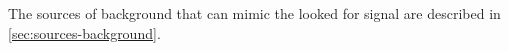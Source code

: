 The sources of background that can mimic the looked for signal are described in
\cref{sec:sources-background}.
